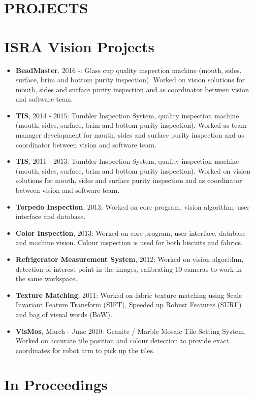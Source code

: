 \documentclass[margin]{res}
\begin{document}
\begin{resume}
		\section{PROJECTS} 
		\normalsize{\section{ISRA Vision Projects}}
		\begin{itemize} \itemsep -2pt %
			\item {\bf BeadMaster}, 2016 -: Glass cup quality inspection machine (mouth, sides, surface, brim and bottom purity inspection). Worked on vision solutions for mouth, sides and surface purity inspection and as coordinator between vision and software team.
			\item {\bf TIS}, 2014 - 2015: Tumbler Inspection System, quality inspection machine (mouth, sides, surface, brim and bottom purity inspection). Worked as team manager development for mouth, sides and surface purity inspection and as coordinator between vision and software team.
			\item {\bf TIS}, 2011 - 2013: Tumbler Inspection System, quality inspection machine (mouth, sides, surface, brim and bottom purity inspection). Worked on vision solutions for mouth, sides and surface purity inspection and as coordinator between vision and software team.
			\item {\bf Torpedo Inspection}, 2013: Worked on core program, vision algorithm, user interface and database.
			\item {\bf Color Inspection}, 2013: Worked on core program, user interface, database and machine vision. Colour inspection is used for both biscuits and fabrics.
			\item {\bf Refrigerator Measurement System}, 2012: Worked on vision algorithm, detection of interest point in the images, calibrating 10 cameras to work in the same workspace.
			\item {\bf Texture Matching}, 2011: Worked on fabric texture matching using Scale Invariant Feature Transform (SIFT), Speeded up Robust Features (SURF) and bag of visual words (BoW).
			\item {\bf VisMos}, March - June 2010: Granite / Marble Mosaic Tile Setting System. Worked on accurate tile position and colour detection to provide exact coordinates for robot arm to pick up the tiles.
		\end{itemize}
		\normalsize{\section{In Proceedings}}

\end{resume}
\end{document}
